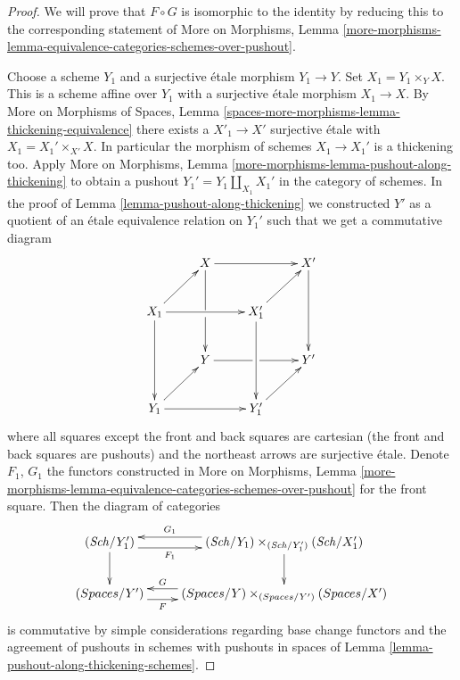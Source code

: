\documentclass{stacks-project}
\theoremstyle{plain}
\theoremstyle{definition}
\theoremstyle{remark}
\numberwithin{equation}{subsection}
\def\Sch{\mathit{Sch}}
\begin{document}
\begin{proof}
We will prove that $F \circ G$ is isomorphic to the identity by
reducing this to the corresponding statement of
More on Morphisms, Lemma
\ref{more-morphisms-lemma-equivalence-categories-schemes-over-pushout}.

\medskip\noindent
Choose a scheme $Y_1$ and a surjective \'etale morphism
$Y_1 \to Y$. Set $X_1 = Y_1 \times_Y X$. This is a scheme affine over
$Y_1$ with a surjective \'etale morphism $X_1 \to X$. By
More on Morphisms of Spaces,
Lemma \ref{spaces-more-morphisms-lemma-thickening-equivalence}
there exists a $X'_1 \to X'$
surjective \'etale with $X_1 = X_1' \times_{X'} X$. In particular the
morphism of schemes $X_1 \to X_1'$ is a thickening too. Apply
More on Morphisms, Lemma \ref{more-morphisms-lemma-pushout-along-thickening}
to obtain a pushout $Y_1' = Y_1 \amalg_{X_1} X_1'$ in the category of
schemes. In the proof of Lemma \ref{lemma-pushout-along-thickening}
we constructed
$Y'$ as a quotient of an \'etale equivalence relation on $Y_1'$
such that we get a commutative diagram
\begin{equation}
\label{equation-cube}
\vcenter{
\xymatrix{
& X \ar[rr] \ar'[d][dd] & & X' \ar[dd] \\
X_1 \ar[rr] \ar[dd] \ar[ru] & & X_1' \ar[dd] \ar[ru] & \\
& Y \ar'[r][rr] & & Y' \\
Y_1 \ar[rr] \ar[ru] & & Y_1' \ar[ru]
}
}
\end{equation}
where all squares except the front and back squares are cartesian
(the front and back squares are pushouts) and the northeast arrows
are surjective \'etale. Denote $F_1$, $G_1$ the
functors constructed in
More on Morphisms, Lemma
\ref{more-morphisms-lemma-equivalence-categories-schemes-over-pushout}
for the front square. Then the diagram of categories
$$
\xymatrix{
(\Sch/Y_1') \ar@<-1ex>[r]_-{F_1} \ar[d] &
(\Sch/Y_1) \times_{(\Sch/Y_1')} (\Sch/X_1') \ar[d] \ar@<-1ex>[l]_-{G_1} \\
(\textit{Spaces}/Y') \ar@<-1ex>[r]_-F &
(\textit{Spaces}/Y) \times_{(\textit{Spaces}/Y')} (\textit{Spaces}/X')
\ar@<-1ex>[l]_-G
}
$$
is commutative by simple considerations regarding base change functors
and the agreement of pushouts in schemes with pushouts in
spaces of Lemma \ref{lemma-pushout-along-thickening-schemes}.


\end{proof}
\end{document}
